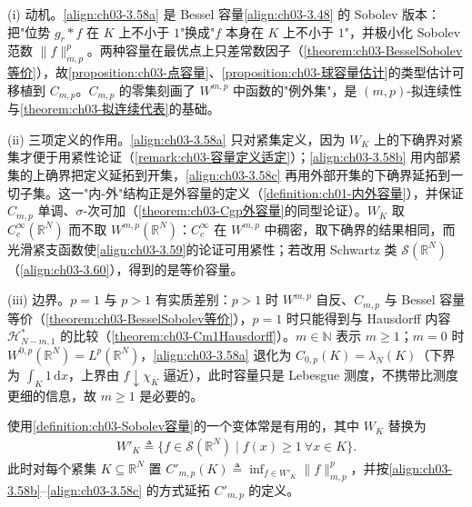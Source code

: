 \documentclass[../../main.tex]{subfiles}%
\begin{document}
\begin{remark}\label{remark:ch03-Sobolev容量动机}
(i) 动机。\eqref{align:ch03-3.58a} 是 Bessel 容量\eqref{align:ch03-3.48} 的 Sobolev 版本：把"位势 $g_r*f$ 在 $K$ 上不小于 $1$"换成"$f$ 本身在 $K$ 上不小于 $1$"，并极小化 Sobolev 范数 $\|f\|_{m,p}^p$。两种容量在最优点上只差常数因子（\cref{theorem:ch03-BesselSobolev等价}），故\cref{proposition:ch03-点容量}、\cref{proposition:ch03-球容量估计}的类型估计可移植到 $C_{m,p}$。$C_{m,p}$ 的零集刻画了 $W^{m,p}$ 中函数的"例外集"，是 $(m,p)$-拟连续性与\cref{theorem:ch03-拟连续代表}的基础。

(ii) 三项定义的作用。\eqref{align:ch03-3.58a} 只对紧集定义，因为 $W_K$ 上的下确界对紧集才便于用紧性论证（\cref{remark:ch03-容量定义适定}）；\eqref{align:ch03-3.58b} 用内部紧集的上确界把定义延拓到开集，\eqref{align:ch03-3.58c} 再用外部开集的下确界延拓到一切子集。这一"内-外"结构正是外容量的定义（\cref{definition:ch01-内外容量}），并保证 $C_{m,p}$ 单调、$\sigma$-次可加（\cref{theorem:ch03-Cgp外容量}的同型论证）。$W_K$ 取 $C^\infty_c(\mathbb{R}^N)$ 而不取 $W^{m,p}(\mathbb{R}^N)$：$C^\infty_c$ 在 $W^{m,p}$ 中稠密，取下确界的结果相同，而光滑紧支函数使\eqref{align:ch03-3.59}的论证可用紧性；若改用 Schwartz 类 $\mathcal{S}(\mathbb{R}^N)$（\eqref{align:ch03-3.60}），得到的是等价容量。

(iii) 边界。$p=1$ 与 $p>1$ 有实质差别：$p>1$ 时 $W^{m,p}$ 自反、$C_{m,p}$ 与 Bessel 容量等价（\cref{theorem:ch03-BesselSobolev等价}），$p=1$ 时只能得到与 Hausdorff 内容 $\mathcal{H}^*_{N-m,1}$ 的比较（\cref{theorem:ch03-Cm1Hausdorff}）。$m\in\mathbb{N}$ 表示 $m\geqslant1$；$m=0$ 时 $W^{0,p}(\mathbb{R}^N)=L^p(\mathbb{R}^N)$，\eqref{align:ch03-3.58a} 退化为 $C_{0,p}(K)=\lambda_N(K)$（下界为 $\int_K1\,\mathrm{d}x$，上界由 $f\downarrow\chi_{\overline K}$ 逼近），此时容量只是 Lebesgue 测度，不携带比测度更细的信息，故 $m\geqslant1$ 是必要的。
\end{remark}

使用\cref{definition:ch03-Sobolev容量}的一个变体常是有用的，其中 $W_K$ 替换为
\begin{align}
W'_K\triangleq \{f\in\mathcal{S}(\mathbb{R}^N)\mid f(x)\geqslant1\ \forall x\in K\}.\label{align:ch03-3.60}
\end{align}
此时对每个紧集 $K\subseteq\mathbb{R}^N$ 置 $C'_{m,p}(K)\triangleq \inf_{f\in W'_K}\|f\|_{m,p}^p$，并按\eqref{align:ch03-3.58b}--\eqref{align:ch03-3.58c} 的方式延拓 $C'_{m,p}$ 的定义。
\end{document}
